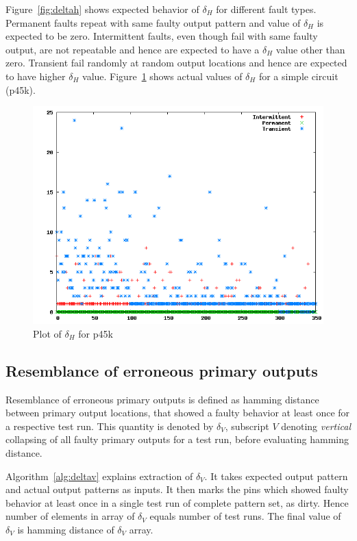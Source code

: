 Figure~\ref{fig:deltah} shows expected behavior of $\delta_H$ for different fault types. Permanent faults repeat with same faulty output pattern and value of $\delta_H$ is expected to be zero. Intermittent faults, even though fail with same faulty output, are not repeatable and hence are expected to have a $\delta_H$ value other than zero. Transient fail randomly at random output locations and hence are expected to have higher $\delta_H$ value. Figure~\ref{fig:deltahp45k} shows actual values of $\delta_H$ for a simple circuit (p45k).

\begin{figure}[h]
  \begin{center}
    \captionsetup{justification=centering}
    \includegraphics[scale=0.35]{figures/deltahp45k.png}
    \caption{Plot of $\delta_H$ for p45k}
    \label{fig:deltahp45k}
  \end{center}
\end{figure}

\subsection{Resemblance of erroneous primary outputs}
Resemblance of erroneous primary outputs is defined as hamming distance between primary output locations, that showed a faulty behavior at least once for a respective test run. This quantity is denoted by $\delta_V$, subscript $V$ denoting \emph{vertical} collapsing of all faulty primary outputs for a test run, before evaluating hamming distance.

Algorithm~\ref{alg:deltav} explains extraction of $\delta_V$. It takes expected output pattern and actual output patterns as inputs. It then marks the pins which showed faulty behavior at least once in a single test run of complete pattern set, as dirty. Hence number of elements in array of $\delta_V$ equals number of test runs. The final value of $\delta_V$ is hamming distance of $\delta_V$ array.

